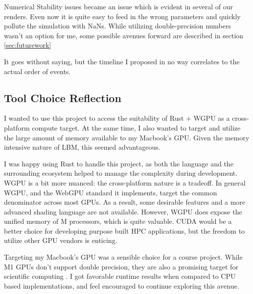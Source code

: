Numerical Stability issues became an issue which
is evident in several of our renders.
Even now it is quite easy to feed in the wrong parameters
and quickly pollute the simulation with NaNs.
While utilizing double-precision numbers wasn't an option for me,
some possible avenues forward are described 
in section \ref{sec:futurework}

It goes without saying, 
but the timeline I proposed 
in no way correlates to the actual order of events.

\subsection{Tool Choice Reflection}
I wanted to use this project to access the suitability of Rust $+$ WGPU 
as a cross-platform compute target.
At the same time, I also wanted to target and 
utilize the large amount of memory available to my Macbook's GPU.
Given the memory intensive nature of LBM, this seemed advantageous.

I was happy using Rust to handle this project, as both the 
language and the surrounding ecosystem helped to manage
the complexity during development.
WGPU is a bit more nuanced: the cross-platform nature
is a tradeoff. In general WGPU, 
and the WebGPU standard it implements,
target the common denominator across most GPUs.
As a result, some desirable features and a more advanced
shading language are not available.
However, WGPU does expose the unified memory of M processors,
which is quite valuable.
CUDA would be a better choice 
for developing purpose built HPC
applications, but the freedom to utilize other GPU vendors is enticing.

Targeting my Macbook's GPU was a sensible choice for a course project.
While M1 GPUs don't support double precision, 
they are also a promising target for scientific computing \cite{Kenyon2022}.
I got favorable runtime results when compared to CPU based implementations,
and feel encouraged to continue exploring this avenue.
